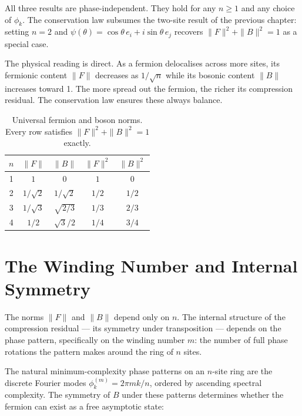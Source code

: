 All three results are phase-independent. They hold for any $n \geq 1$
and any choice of $\phi_k$. The conservation law subsumes the
two-site result of the previous chapter: setting $n = 2$ and
$\psi(\theta) = \cos\theta\,e_i + i\sin\theta\,e_j$ recovers
$\|F\|^2 + \|B\|^2 = 1$ as a special case.

The physical reading is direct. As a fermion delocalises across more
sites, its fermionic content $\|F\|$ decreases as $1/\sqrt{n}$ while
its bosonic content $\|B\|$ increases toward 1. The more spread out
the fermion, the richer its compression residual. The conservation
law ensures these always balance.

\begin{table}[h]
\centering
\begin{tabular}{ccccc}
\toprule
$n$ & $\|F\|$ & $\|B\|$ & $\|F\|^2$ & $\|B\|^2$ \\
\midrule
1 & $1$          & $0$          & $1$   & $0$ \\
2 & $1/\sqrt{2}$ & $1/\sqrt{2}$ & $1/2$ & $1/2$ \\
3 & $1/\sqrt{3}$ & $\sqrt{2/3}$ & $1/3$ & $2/3$ \\
4 & $1/2$        & $\sqrt{3}/2$ & $1/4$ & $3/4$ \\
\bottomrule
\end{tabular}
\caption{Universal fermion and boson norms. Every row satisfies
$\|F\|^2 + \|B\|^2 = 1$ exactly.}
\end{table}

\section{The Winding Number and Internal Symmetry}

The norms $\|F\|$ and $\|B\|$ depend only on $n$. The internal
structure of the compression residual --- its symmetry under
transposition --- depends on the phase pattern, specifically on the
winding number $m$: the number of full phase rotations the pattern
makes around the ring of $n$ sites.

The natural minimum-complexity phase patterns on an $n$-site ring are
the discrete Fourier modes $\phi_k^{(m)} = 2\pi mk/n$, ordered by
ascending spectral complexity. The symmetry of $B$ under these
patterns determines whether the fermion can exist as a free asymptotic
state:

